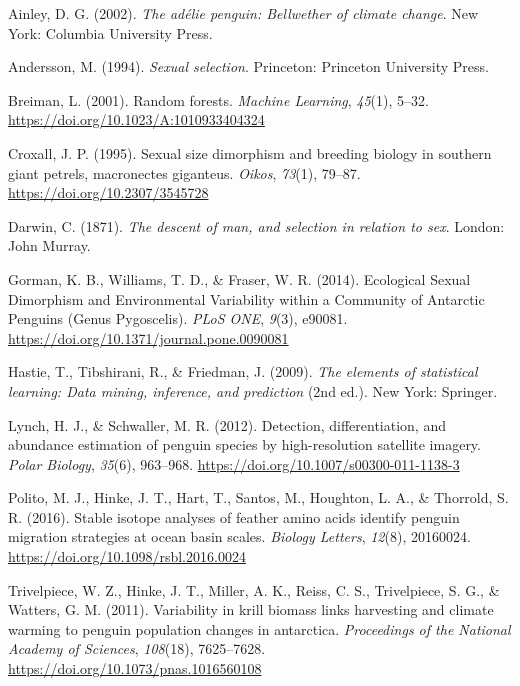 \documentclass[
]{agujournal2019}
\newlength{\cslhangindent}
\newenvironment{CSLReferences}[2] %
 {\begin{list}{}{%
  \setlength{\itemindent}{0pt}
  \setlength{\leftmargin}{0pt}
  \setlength{\parsep}{0pt}
  \ifodd #1
   \setlength{\leftmargin}{\cslhangindent}
   \setlength{\itemindent}{-1\cslhangindent}
  \fi
  \setlength{\itemsep}{#2\baselineskip}}}
 {\end{list}}
\begin{document}
\label{refs}
\begin{CSLReferences}{1}{0}
\vspace{1em}

Ainley, D. G. (2002). \emph{The ad{é}lie penguin: Bellwether of climate
change}. New York: Columbia University Press.

Andersson, M. (1994). \emph{Sexual selection}. Princeton: Princeton
University Press.

Breiman, L. (2001). Random forests. \emph{Machine Learning},
\emph{45}(1), 5--32. \url{https://doi.org/10.1023/A:1010933404324}

Croxall, J. P. (1995). Sexual size dimorphism and breeding biology in
southern giant petrels, macronectes giganteus. \emph{Oikos},
\emph{73}(1), 79--87. \url{https://doi.org/10.2307/3545728}

Darwin, C. (1871). \emph{The descent of man, and selection in relation
to sex}. London: John Murray.

Gorman, K. B., Williams, T. D., \& Fraser, W. R. (2014). Ecological
Sexual Dimorphism and Environmental Variability within a Community of
Antarctic Penguins (Genus Pygoscelis). \emph{PLoS ONE}, \emph{9}(3),
e90081. \url{https://doi.org/10.1371/journal.pone.0090081}

Hastie, T., Tibshirani, R., \& Friedman, J. (2009). \emph{The elements
of statistical learning: Data mining, inference, and prediction} (2nd
ed.). New York: Springer.

Lynch, H. J., \& Schwaller, M. R. (2012). Detection, differentiation,
and abundance estimation of penguin species by high-resolution satellite
imagery. \emph{Polar Biology}, \emph{35}(6), 963--968.
\url{https://doi.org/10.1007/s00300-011-1138-3}

Polito, M. J., Hinke, J. T., Hart, T., Santos, M., Houghton, L. A., \&
Thorrold, S. R. (2016). Stable isotope analyses of feather amino acids
identify penguin migration strategies at ocean basin scales.
\emph{Biology Letters}, \emph{12}(8), 20160024.
\url{https://doi.org/10.1098/rsbl.2016.0024}

Trivelpiece, W. Z., Hinke, J. T., Miller, A. K., Reiss, C. S.,
Trivelpiece, S. G., \& Watters, G. M. (2011). Variability in krill
biomass links harvesting and climate warming to penguin population
changes in antarctica. \emph{Proceedings of the National Academy of
Sciences}, \emph{108}(18), 7625--7628.
\url{https://doi.org/10.1073/pnas.1016560108}


\end{CSLReferences}
\end{document}
